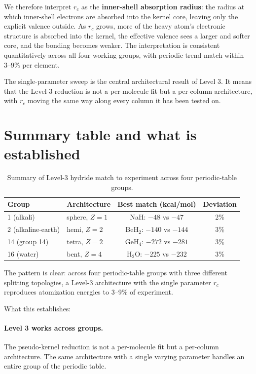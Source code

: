 We therefore interpret $r_c$ as the \textbf{inner-shell absorption radius}: the radius at which inner-shell electrons are absorbed into the kernel core, leaving only the explicit valence outside. As $r_c$ grows, more of the heavy atom's electronic structure is absorbed into the kernel, the effective valence sees a larger and softer core, and the bonding becomes weaker. The interpretation is consistent quantitatively across all four working groups, with periodic-trend match within 3--9\% per element.

The single-parameter sweep is the central architectural result of Level 3. It means that the Level-3 reduction is not a per-molecule fit but a per-column architecture, with $r_c$ moving the same way along every column it has been tested on.

\section{Summary table and what is established}\label{sec:hydride-summary}

\begin{table}[h]
\centering\small
\caption{Summary of Level-3 hydride match to experiment across four periodic-table groups.}\label{tab:hydride-summary}
\begin{tabular}{l l c c}
\toprule
Group & Architecture & Best match (kcal/mol) & Deviation \\
\midrule
1  (alkali)            & sphere, $Z = 1$ & NaH: $-48$ vs $-47$           & 2\% \\
2  (alkaline-earth)    & hemi, $Z = 2$   & BeH$_2$: $-140$ vs $-144$     & 3\% \\
14 (group 14)          & tetra, $Z = 2$  & GeH$_4$: $-272$ vs $-281$     & 3\% \\
16 (water)             & bent, $Z = 4$   & H$_2$O: $-225$ vs $-232$      & 3\% \\
\bottomrule
\end{tabular}
\end{table}

The pattern is clear: across four periodic-table groups with three different splitting topologies, a Level-3 architecture with the single parameter $r_c$ reproduces atomization energies to 3--9\% of experiment.

What this establishes:

\paragraph{Level 3 works across groups.} The pseudo-kernel reduction is not a per-molecule fit but a per-column architecture. The same architecture with a single varying parameter handles an entire group of the periodic table.

